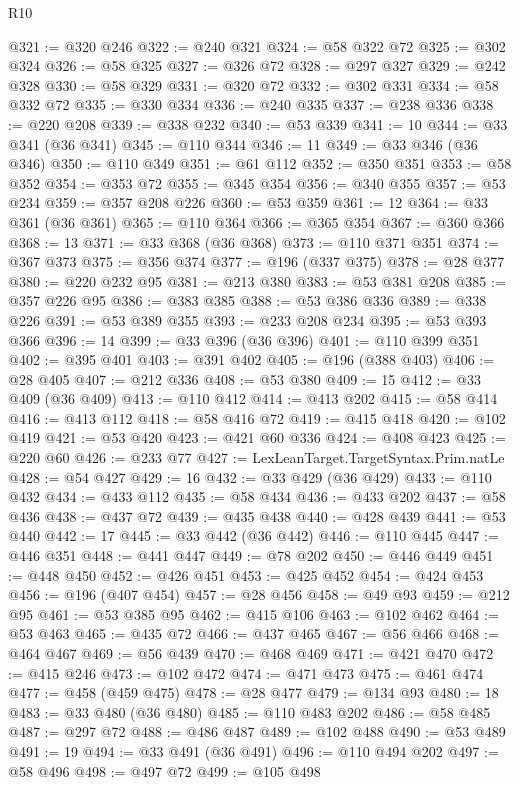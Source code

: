 \begin{lexlean}{R10}
\begin{coremodule}
@321 := @320 @246
@322 := @240 @321
@324 := @58 @322 @72
@325 := @302 @324
@326 := @58 @325
@327 := @326 @72
@328 := @297 @327
@329 := @242 @328
@330 := @58 @329
@331 := @320 @72
@332 := @302 @331
@334 := @58 @332 @72
@335 := @330 @334
@336 := @240 @335
@337 := @238 @336
@338 := @220 @208
@339 := @338 @232
@340 := @53 @339
@341 := 10
@344 := @33 @341 (@36 @341)
@345 := @110 @344
@346 := 11
@349 := @33 @346 (@36 @346)
@350 := @110 @349
@351 := @61 @112
@352 := @350 @351
@353 := @58 @352
@354 := @353 @72
@355 := @345 @354
@356 := @340 @355
@357 := @53 @234
@359 := @357 @208 @226
@360 := @53 @359
@361 := 12
@364 := @33 @361 (@36 @361)
@365 := @110 @364
@366 := @365 @354
@367 := @360 @366
@368 := 13
@371 := @33 @368 (@36 @368)
@373 := @110 @371 @351
@374 := @367 @373
@375 := @356 @374
@377 := @196 (@337 @375)
@378 := @28 @377
@380 := @220 @232 @95
@381 := @213 @380
@383 := @53 @381 @208
@385 := @357 @226 @95
@386 := @383 @385
@388 := @53 @386 @336
@389 := @338 @226
@391 := @53 @389 @355
@393 := @233 @208 @234
@395 := @53 @393 @366
@396 := 14
@399 := @33 @396 (@36 @396)
@401 := @110 @399 @351
@402 := @395 @401
@403 := @391 @402
@405 := @196 (@388 @403)
@406 := @28 @405
@407 := @212 @336
@408 := @53 @380
@409 := 15
@412 := @33 @409 (@36 @409)
@413 := @110 @412
@414 := @413 @202
@415 := @58 @414
@416 := @413 @112
@418 := @58 @416 @72
@419 := @415 @418
@420 := @102 @419
@421 := @53 @420
@423 := @421 @60 @336
@424 := @408 @423
@425 := @220 @60
@426 := @233 @77
@427 := LexLeanTarget.TargetSyntax.Prim.natLe
@428 := @54 @427
@429 := 16
@432 := @33 @429 (@36 @429)
@433 := @110 @432
@434 := @433 @112
@435 := @58 @434
@436 := @433 @202
@437 := @58 @436
@438 := @437 @72
@439 := @435 @438
@440 := @428 @439
@441 := @53 @440
@442 := 17
@445 := @33 @442 (@36 @442)
@446 := @110 @445
@447 := @446 @351
@448 := @441 @447
@449 := @78 @202
@450 := @446 @449
@451 := @448 @450
@452 := @426 @451
@453 := @425 @452
@454 := @424 @453
@456 := @196 (@407 @454)
@457 := @28 @456
@458 := @49 @93
@459 := @212 @95
@461 := @53 @385 @95
@462 := @415 @106
@463 := @102 @462
@464 := @53 @463
@465 := @435 @72
@466 := @437 @465
@467 := @56 @466
@468 := @464 @467
@469 := @56 @439
@470 := @468 @469
@471 := @421 @470
@472 := @415 @246
@473 := @102 @472
@474 := @471 @473
@475 := @461 @474
@477 := @458 (@459 @475)
@478 := @28 @477
@479 := @134 @93
@480 := 18
@483 := @33 @480 (@36 @480)
@485 := @110 @483 @202
@486 := @58 @485
@487 := @297 @72
@488 := @486 @487
@489 := @102 @488
@490 := @53 @489
@491 := 19
@494 := @33 @491 (@36 @491)
@496 := @110 @494 @202
@497 := @58 @496
@498 := @497 @72
@499 := @105 @498

\end{coremodule}
\end{lexlean}
